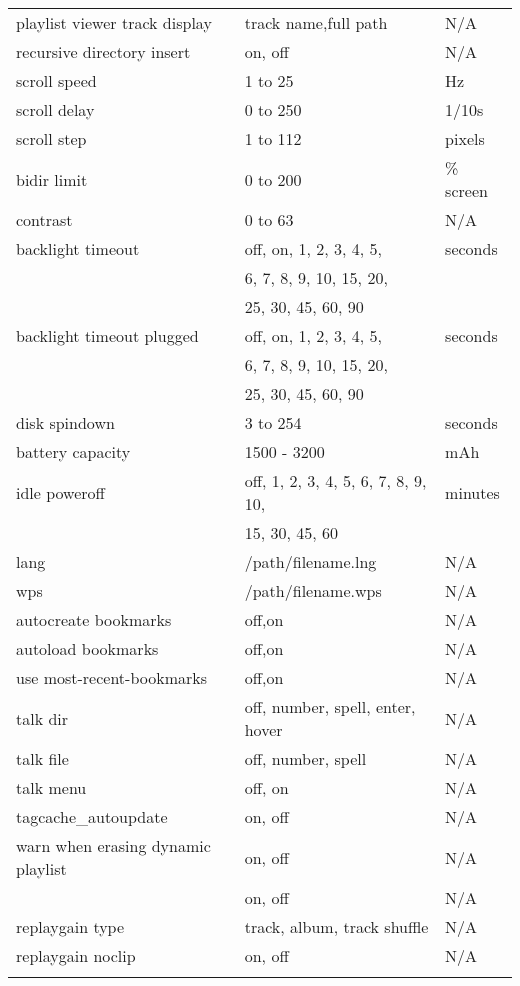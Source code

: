 \begin{center}
\begin{longtable}{@{}lll@{}}
    playlist viewer track display & track name,full path & N/A\\
    recursive directory insert & on, off & N/A\\
    scroll speed & 1 to 25 & Hz\\
    scroll delay & 0 to 250 & 1/10s\\
    scroll step & 1 to 112 & pixels\\
    bidir limit & 0 to 200 & \% screen\\
    contrast & 0 to 63 & N/A\\
    backlight timeout & off, on, 1, 2, 3, 4, 5, & seconds\\
                      & 6, 7, 8, 9, 10, 15, 20, & \\
                      & 25, 30, 45, 60, 90 & \\
    backlight timeout plugged & off, on, 1, 2, 3, 4, 5, & seconds\\
                              & 6, 7, 8, 9, 10, 15, 20, & \\
                              & 25, 30, 45, 60, 90 & \\
    disk spindown & 3 to 254 & seconds\\
    battery capacity & 1500 - 3200 & mAh\\
    idle poweroff & off, 1, 2, 3, 4, 5, 6, 7, 8, 9, 10, & minutes\\
                  & 15, 30, 45, 60 & \\
    lang & /path/filename.lng & N/A\\
    wps & /path/filename.wps & N/A\\
    autocreate bookmarks & off,on & N/A\\
    autoload bookmarks & off,on & N/A\\
    use most-recent-bookmarks & off,on & N/A\\
    talk dir & off, number, spell, enter, hover & N/A\\
    talk file & off, number, spell & N/A\\
    talk menu & off, on & N/A\\
    tagcache\_autoupdate & on, off & N/A\\
    warn when erasing dynamic playlist & on, off & N/A\\
%
    \opt{SWCODEC}{
      replaygain & on, off & N/A\\
      replaygain type & track, album, track shuffle & N/A\\
      replaygain noclip & on, off & N/A\\
}
\end{longtable}
\end{center}
